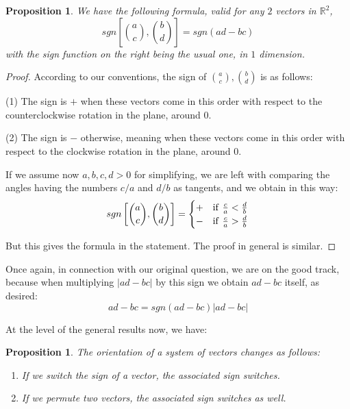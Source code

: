 \documentclass[12pt]{amsbook}
\newtheorem{proposition}[theorem]{Proposition}
\begin{document}
\begin{proposition}
We have the following formula, valid for any $2$ vectors in $\mathbb R^2$,
$$sgn\left[\binom{a}{c},\binom{b}{d}\right]=sgn(ad-bc)$$
with the sign function on the right being the usual one, in $1$ dimension.
\end{proposition}

\begin{proof}
According to our conventions, the sign of $\binom{a}{c},\binom{b}{d}$ is as follows:

\medskip

(1) The sign is $+$ when these vectors come in this order with respect to the counterclockwise rotation in the plane, around 0.

\medskip

(2) The sign is $-$ otherwise, meaning when these vectors come in this order with respect to the clockwise rotation in the plane, around 0. 

\medskip

If we assume now $a,b,c,d>0$ for simplifying, we are left with comparing the angles having the numbers $c/a$ and $d/b$ as tangents, and we obtain in this way:
$$sgn\left[\binom{a}{c},\binom{b}{d}\right]=
\begin{cases}
+&{\rm if}\ \frac{c}{a}<\frac{d}{b}\\
-&{\rm if}\ \frac{c}{a}>\frac{d}{b}
\end{cases}$$

But this gives the formula in the statement. The proof in general is similar.
\end{proof}

Once again, in connection with our original question, we are on the good track, because when multiplying $|ad-bc|$ by this sign we obtain $ad-bc$ itself, as desired:
$$ad-bc=sgn(ad-bc)|ad-bc|$$

At the level of the general results now, we have:

\begin{proposition}
The orientation of a system of vectors changes as follows:
\begin{enumerate}
\item If we switch the sign of a vector, the associated sign switches.

\item If we permute two vectors, the associated sign switches as well.
\end{enumerate}
\end{proposition}
\end{document}
